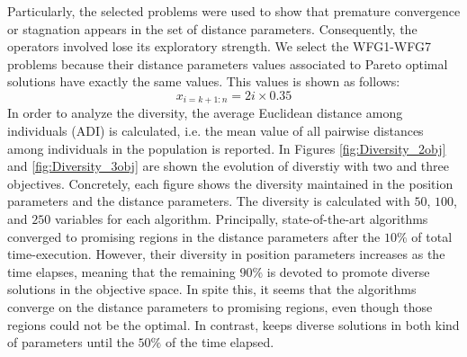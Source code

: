 %
Particularly, the selected problems were used to show that premature convergence or stagnation appears in the set of distance parameters.
%
Consequently, the operators involved lose its exploratory strength.
%
%
%
%
%
%
%
%
We select the WFG1-WFG7 problems because their distance parameters values associated to Pareto optimal solutions have exactly the same values.
%
This values is shown as follows:
\begin{equation}
   x_{i=k+1:n} = 2i \times 0.35
\end{equation}
%
%
%
In order to analyze the diversity, the average Euclidean distance among individuals (ADI) is calculated, i.e. the mean value of all pairwise distances among individuals in the population is reported.
%
In Figures \ref{fig:Diversity_2obj} and \ref{fig:Diversity_3obj} are shown the evolution of diverstiy with two and three objectives.
%
Concretely, each figure shows the diversity maintained in the position parameters and the distance parameters.
%
The diversity is calculated with $50$, $100$, and $250$ variables for each algorithm.
%
Principally, state-of-the-art algorithms converged to promising regions in the distance parameters after the $10\%$ of total time-execution.
%
However, their diversity in position parameters increases as the time elapses, meaning that the remaining $90\%$ is devoted to promote diverse solutions in the objective space.
%
In spite this, it seems that the algorithms converge on the distance parameters to promising regions, even though those regions could not be the optimal.
%
In contrast, \VSDMOEA{} keeps diverse solutions in both kind of parameters until the $50\%$ of the time elapsed.
%


